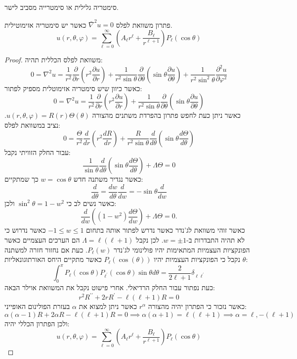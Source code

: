 \documentclass{tstextbook}
\begin{document}
\begin{definition}
סימטריה גלילית או סימטרייה מסביב לישר.

\end{definition}
\begin{proposition}
פתרון משוואת לפלס \(\bar{\nabla}^2u=0\) כאשר יש סימטריה אזימוטילית.
$$ u\left(r,\theta,\varphi\right)=\sum_{\ell=0}^{\infty}\left(A_\ell r^\ell+\frac{B_\ell}{r^{\ell+1}}\right)P_\ell\left(\cos\theta\right)$$

\end{proposition}
\begin{proof}
משוואת לפלס הכללית תהיה:
$$0=\nabla^{2}u={\frac{1}{r^{2}}}{\frac{\partial}{\partial r}}\left(r^{2}{\frac{\partial u}{\partial r}}\right)+{\frac{1}{r^{2}\sin\theta}}{\frac{\partial}{\partial\theta}}\left(\sin\theta{\frac{\partial u}{\partial\theta}}\right)+{\frac{1}{r^{2}\sin^{2}\theta}}{\frac{\partial^{2}u}{\partial\varphi^{2}}}$$
כאשר כיוון שיש סימטריה אזימוטלית מספיק לפתור:
$$0=\nabla^{2}u={\frac{1}{r^{2}}}{\frac{\partial}{\partial r}}\left(r^{2}{\frac{\partial u}{\partial r}}\right)+{\frac{1}{r^{2}\sin\theta}}{\frac{\partial}{\partial\theta}}\left(\sin\theta{\frac{\partial u}{\partial\theta}}\right)$$
כאשר ניתן כעת לחפש פתרון בהפרדת משתנים מהצורה \(u\left( r,\theta,\varphi \right)=R(r)\Theta\left( \theta \right)\). נציב במשוואת לפלס:
$$0=\frac{\Theta}{r^{2}}\frac{d}{d r}\left(r^{2}\frac{d R}{d r}\right)+\frac{R}{r^{2}\sin\theta}\frac{d}{d\theta}\left(\sin\theta\frac{d\Theta}{d\theta}\right)$$
עבור החלק הזוויתי נקבל:
$$\frac{1}{\sin\theta}\frac{d}{d\theta}\left(\sin\theta\frac{d\Theta}{d\theta}\right)+\Lambda\Theta=0$$
כאשר נגדיר משתנה חדש \(w=\cos \theta\) כך שמתקיים:
$${\frac{d}{d\theta}}={\frac{d w}{d\theta}}{\frac{d}{d w}}=-\sin\theta{\frac{d}{d w}}$$
כאשר נשים לב כי \(\sin ^{2}\theta=1-w^{2}\) ולכן:
$$\frac{d}{d w}\left((1-w^{2})\frac{d\Theta}{d w}\right)+\Lambda\Theta=0.$$
כאשר זוהי משוואת לג'נדר כאשר נדרש לפתור אותה בתחום \(-1\leq w\leq 1\) כאשר נדרוש כי לא תהיה התבדרות ב-\(w=\pm 1\). לכן נקבל \(\Lambda=\ell\left( \ell+1 \right)\) הם הערכים העצמיים כאשר הפונקציות העצמיות המתאימות יהיו פולינומי לג'נדר \(P_{\ell}(w)\). כעת אם נחזור חזרה למשתנה \(\theta\) נקבל כי הפונקציות העצמיות יהיו \(P_{\ell}\left( \cos\left( \theta \right) \right)\) כאשר מתקיים היחס האורתוגונאליות:
$$\int_{0}^{\pi}P_{\ell}\left(\cos\theta\right)P_{\ell^{\prime}}\left(\cos\theta\right)\sin\theta d\theta=\frac{2}{2\ell+1}\delta_{\ell\ell^{\prime}}$$
כעת נפתור עבור החלק הרדיאלי. אחרי פישוט נקבל את המשוואת אוילר הבאה:
$$r^{2}R^{\prime\prime}+2r R^{\prime}-\ell(\ell+1)R=0$$
כאשר נזכור כי הפתרון יהיה מהצורה \(r^{\alpha}\) כאשר ניתן למצוא את \(\alpha\) בעזרת הפולינום האופייני:
$$\alpha\left( \alpha-1 \right)R+2\alpha R-\ell\left( \ell+1 \right)R=0\implies\alpha\left( \alpha+1 \right)=\ell\left( \ell+1 \right)\implies \alpha=\ell,-\left( \ell+1 \right)$$
ולכן הפתרון הכללי יהיה:
$$u\left(r,\theta,\varphi\right)=\sum_{\ell=0}^{\infty}\left(A_{\ell}r^{\ell}+\frac{B_{\ell}}{r^{\ell+1}}\right)P_{\ell}\left(\cos\theta\right)$$

\end{proof}
\end{document}
